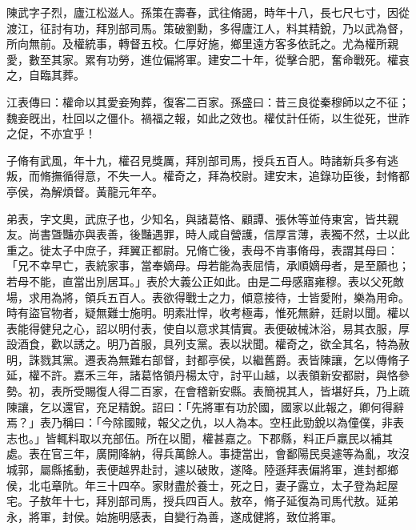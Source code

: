 
\begin{pinyinscope}
陳武字子烈，廬江松滋人。孫策在壽春，武往脩謁，時年十八，長七尺七寸，因從渡江，征討有功，拜別部司馬。策破劉勳，多得廬江人，料其精銳，乃以武為督，所向無前。及權統事，轉督五校。仁厚好施，鄉里遠方客多依託之。尤為權所親愛，數至其家。累有功勞，進位偏將軍。建安二十年，從擊合肥，奮命戰死。權哀之，自臨其葬。

江表傳曰：權命以其愛妾殉葬，復客二百家。孫盛曰：昔三良從秦穆師以之不征；魏妾旣出，杜回以之僵仆。禍福之報，如此之效也。權仗計任術，以生從死，世祚之促，不亦宜乎！

子脩有武風，年十九，權召見獎厲，拜別部司馬，授兵五百人。時諸新兵多有逃叛，而脩撫循得意，不失一人。權奇之，拜為校尉。建安末，追錄功臣後，封脩都亭侯，為解煩督。黃龍元年卒。

弟表，字文奧，武庶子也，少知名，與諸葛恪、顧譚、張休等並侍東宮，皆共親友。尚書曁豔亦與表善，後豔遇罪，時人咸自營護，信厚言薄，表獨不然，士以此重之。徙太子中庶子，拜翼正都尉。兄脩亡後，表母不肯事脩母，表謂其母曰：「兄不幸早亡，表統家事，當奉嫡母。母若能為表屈情，承順嫡母者，是至願也；若母不能，直當出別居耳。」表於大義公正如此。由是二母感寤雍穆。表以父死敵場，求用為將，領兵五百人。表欲得戰士之力，傾意接待，士皆愛附，樂為用命。時有盜官物者，疑無難士施明。明素壯悍，收考極毒，惟死無辭，廷尉以聞。權以表能得健兒之心，詔以明付表，使自以意求其情實。表便破械沐浴，易其衣服，厚設酒食，歡以誘之。明乃首服，具列支黨。表以狀聞。權奇之，欲全其名，特為赦明，誅戮其黨。遷表為無難右部督，封都亭侯，以繼舊爵。表皆陳讓，乞以傳脩子延，權不許。嘉禾三年，諸葛恪領丹楊太守，討平山越，以表領新安都尉，與恪參勢。初，表所受賜復人得二百家，在會稽新安縣。表簡視其人，皆堪好兵，乃上疏陳讓，乞以還官，充足精銳。詔曰：「先將軍有功於國，國家以此報之，卿何得辭焉？」表乃稱曰：「今除國賊，報父之仇，以人為本。空枉此勁銳以為僮僕，非表志也。」皆輒料取以充部伍。所在以聞，權甚嘉之。下郡縣，料正戶羸民以補其處。表在官三年，廣開降納，得兵萬餘人。事捷當出，會鄱陽民吳遽等為亂，攻沒城郭，屬縣搖動，表便越界赴討，遽以破敗，遂降。陸遜拜表偏將軍，進封都鄉侯，北屯章阬。年三十四卒。家財盡於養士，死之日，妻子露立，太子登為起屋宅。子敖年十七，拜別部司馬，授兵四百人。敖卒，脩子延復為司馬代敖。延弟永，將軍，封侯。始施明感表，自變行為善，遂成健將，致位將軍。


\end{pinyinscope}